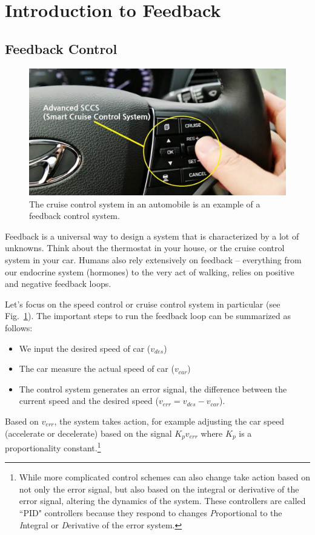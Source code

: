 \section{Introduction to Feedback}
\subsection{Feedback Control}

\begin{figure}[tb]
\begin{center}
\includegraphics[width=.5\columnwidth]{image_0.png}
\end{center}
\caption{The cruise control system in an automobile is an example of a feedback control system.} \label{fig:image_0.png}
\end{figure}

Feedback is a universal way to design a system that is characterized by a lot of unknowns.  Think about the thermostat in your house, or the cruise control system in your car.  Humans also rely extensively on feedback -- everything from our endocrine system (hormones) to the very act of walking, relies on positive and negative feedback loops.  

Let's focus on the speed control or cruise control system in particular (see Fig.~\ref{fig:image_0.png}).  The important steps to run the feedback loop can be summarized as follows:
\begin{itemize}
\item We input the desired speed of car ($v_{des}$)
\item The car measure the actual speed of car ($v_{car}$)
\item The control system generates an error signal, the difference between the current speed and the desired speed ($v_{err} = v_{des} - v_{car}$).
\end{itemize}

Based on $v_{err}$, the system takes action, for example adjusting the car speed (accelerate or decelerate) based on the signal $K_p v_{err}$ where $K_p$ is a proportionality constant.\footnote{While more complicated control schemes can also change take action based on not only the error signal, but also based on the integral or derivative of the error signal, altering the dynamics of the system.  These controllers are called ``PID" controllers because they respond to changes \emph{P}roportional to the \emph{I}ntegral or \emph{D}erivative of the error system.}

